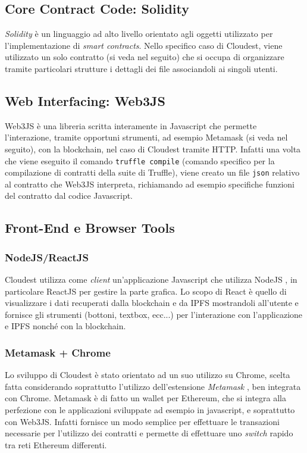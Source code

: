 \documentclass{article}
\begin{document}
\subsection{Core Contract Code: Solidity}
\textit{Solidity} \cite{solidity} è un linguaggio ad alto livello orientato agli oggetti utilizzato per l'implementazione di \textit{smart contracts}. Nello specifico caso di Cloudest, viene utilizzato un solo contratto (si veda nel seguito) che si occupa di organizzare tramite particolari strutture i dettagli dei file associandoli ai singoli utenti.

\subsection{Web Interfacing: Web3JS}
Web3JS \cite{web3js} è una libreria scritta interamente in Javascript che permette l'interazione, tramite opportuni strumenti, ad esempio Metamask (si veda nel seguito), con la blockchain, nel caso di Cloudest tramite HTTP.
Infatti una volta che viene eseguito il comando \texttt{truffle compile} (comando specifico per la compilazione di contratti della suite di Truffle), viene creato un file \texttt{json} relativo al contratto che Web3JS interpreta, richiamando ad esempio specifiche funzioni del contratto dal codice Javascript.

\subsection{Front-End e Browser Tools}
\subsubsection{NodeJS/ReactJS}
Cloudest utilizza come \textit{client} un'applicazione Javascript che utilizza NodeJS \cite{nodejs}, in particolare ReactJS \cite{reactjs} per gestire la parte grafica. Lo scopo di React è quello di visualizzare i dati recuperati dalla blockchain e da IPFS mostrandoli all'utente e fornisce gli strumenti (bottoni, textbox, ecc...) per l'interazione con l'applicazione e IPFS nonché con la blockchain.

\subsubsection{Metamask + Chrome}
Lo sviluppo di Cloudest è stato orientato ad un suo utilizzo su Chrome, scelta fatta considerando soprattutto l'utilizzo dell'estensione \textit{Metamask} \cite{metamask}, ben integrata con Chrome. Metamask è di fatto un wallet per Ethereum, che si integra alla perfezione con le applicazioni sviluppate ad esempio in javascript, e soprattutto con Web3JS. Infatti fornisce un modo semplice per effettuare le transazioni necessarie per l'utilizzo dei contratti e permette di effettuare uno \textit{switch} rapido tra reti Ethereum differenti.
\end{document}
